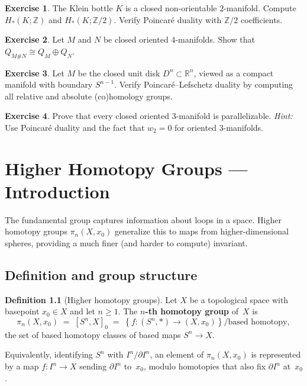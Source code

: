 \documentclass[12pt,a4paper,openany]{book}
\theoremstyle{definition}
\newtheorem{definition}{Definition}[chapter]
\newtheorem{exercise}{Exercise}[chapter]
\theoremstyle{plain}
\theoremstyle{remark}
\newcommand{\Z}{\mathbb{Z}}
\newcommand{\R}{\mathbb{R}}
\newcommand{\set}[1]{\left\{#1\right\}}
\begin{document}
\begin{exercise}
The Klein bottle $K$ is a closed non-orientable $2$-manifold.  Compute
$H_*(K;\Z)$ and $H_*(K;\Z/2)$.  Verify Poincar\'e duality with
$\Z/2$ coefficients.
\end{exercise}

\begin{exercise}
Let $M$ and $N$ be closed oriented $4$-manifolds.  Show that
$Q_{M\# N}\cong Q_M\oplus Q_N$.
\end{exercise}

\begin{exercise}
Let $M$ be the closed unit disk $D^n\subset\R^n$, viewed as a compact
manifold with boundary $S^{n-1}$.  Verify Poincar\'e--Lefschetz
duality by computing all relative and absolute (co)homology groups.
\end{exercise}

\begin{exercise}
Prove that every closed oriented $3$-manifold is parallelizable.
\textit{Hint:} Use Poincar\'e duality and the fact that $w_2=0$
for oriented $3$-manifolds.
\end{exercise}


\chapter{Higher Homotopy Groups --- Introduction}\label{ch:higher-homotopy}
\minitoc\bigskip

The fundamental group captures information about loops in a space.
Higher homotopy groups $\pi_n(X,x_0)$ generalize this to maps from
higher-dimensional spheres, providing a much finer (and harder to
compute) invariant.

\section{Definition and group structure}\label{sec:pin-definition}

\begin{definition}[Higher homotopy groups]
Let $X$ be a topological space with basepoint $x_0\in X$ and let
$n\ge1$.  The \textbf{$n$-th homotopy group} of~$X$ is
\[
  \pi_n(X,x_0)
  \;=\;
  [S^n,X]_0
  \;=\;
  \set{f\colon (S^n,*)\to(X,x_0)} / \text{based homotopy},
\]
the set of based homotopy classes of based maps $S^n\to X$.

Equivalently, identifying $S^n$ with $I^n/\partial I^n$, an element
of $\pi_n(X,x_0)$ is represented by a map $f\colon I^n\to X$ sending
$\partial I^n$ to~$x_0$, modulo homotopies that also fix $\partial
I^n$ at~$x_0$.
\end{definition}
\end{document}
